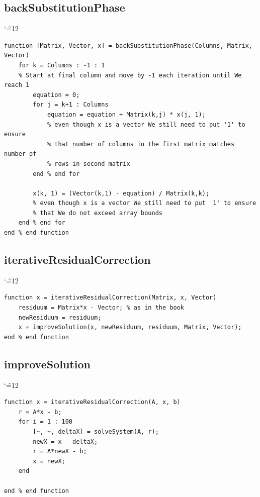 \documentclass[12pt]{report}
\newenvironment{simplechar}{%
   \catcode`\^=12
}{}
\begin{document}
\subsection{backSubstitutionPhase}
\begin{simplechar}
\begin{lstlisting}
function [Matrix, Vector, x] = backSubstitutionPhase(Columns, Matrix, Vector)
    for k = Columns : -1 : 1
    % Start at final column and move by -1 each iteration until We reach 1
        equation = 0;
        for j = k+1 : Columns
            equation = equation + Matrix(k,j) * x(j, 1);
            % even though x is a vector We still need to put '1' to ensure
            % that number of columns in the first matrix matches number of
            % rows in second matrix
        end % end for

        x(k, 1) = (Vector(k,1) - equation) / Matrix(k,k);
        % even though x is a vector We still need to put '1' to ensure
        % that We do not exceed array bounds
    end % end for
end % end function
\end{lstlisting}
\end{simplechar}

\subsection{iterativeResidualCorrection}
\begin{simplechar}
\begin{lstlisting}
function x = iterativeResidualCorrection(Matrix, x, Vector)
    residuum = Matrix*x - Vector; % as in the book
    newResiduum = residuum;
    x = improveSolution(x, newResiduum, residuum, Matrix, Vector);
end % end function
\end{lstlisting}
\end{simplechar}

\subsection{improveSolution}
\begin{simplechar}
\begin{lstlisting}
function x = iterativeResidualCorrection(A, x, b)
    r = A*x - b;
    for i = 1 : 100
        [~, ~, deltaX] = solveSystem(A, r);
        newX = x - deltaX;
        r = A*newX - b;
        x = newX;
    end

end % end function

\end{lstlisting}
\end{simplechar}
\end{document}
